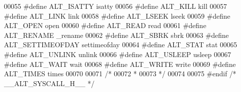 \begin{DoxyCode}
00055 \textcolor{preprocessor}{#define ALT\_ISATTY       isatty}
00056 \textcolor{preprocessor}{#define ALT\_KILL         kill}
00057 \textcolor{preprocessor}{#define ALT\_LINK         link}
00058 \textcolor{preprocessor}{#define ALT\_LSEEK        lseek}
00059 \textcolor{preprocessor}{#define ALT\_OPEN         open}
00060 \textcolor{preprocessor}{#define ALT\_READ         read}
00061 \textcolor{preprocessor}{#define ALT\_RENAME       \_rename}
00062 \textcolor{preprocessor}{#define ALT\_SBRK         sbrk}
00063 \textcolor{preprocessor}{#define ALT\_SETTIMEOFDAY settimeofday}
00064 \textcolor{preprocessor}{#define ALT\_STAT         stat}
00065 \textcolor{preprocessor}{#define ALT\_UNLINK       unlink}
00066 \textcolor{preprocessor}{#define ALT\_USLEEP       usleep}
00067 \textcolor{preprocessor}{#define ALT\_WAIT         wait}
00068 \textcolor{preprocessor}{#define ALT\_WRITE        write}
00069 \textcolor{preprocessor}{#define ALT\_TIMES        times}
00070 
00071 \textcolor{comment}{/*}
00072 \textcolor{comment}{ *}
00073 \textcolor{comment}{ */}
00074 
00075 \textcolor{preprocessor}{#endif }\textcolor{comment}{/* \_\_ALT\_SYSCALL\_H\_\_ */}\textcolor{preprocessor}{}
\end{DoxyCode}
